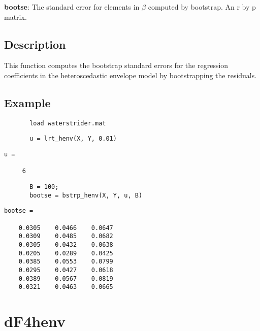 \documentclass[a4paper,11pt,openany]{memoir}
\begin{document}
\begin{par}
\textbf{bootse}: The standard error for elements in $\beta$ computed by bootstrap.  An r by p matrix.
\end{par} \vspace{1em}


\subsection*{Description}

\begin{par}
This function computes the bootstrap standard errors for the regression coefficients in the heteroscedastic envelope model by bootstrapping the residuals.
\end{par} \vspace{1em}


\subsection*{Example}


\begin{verbatim}       load waterstrider.mat\end{verbatim}
    
\begin{verbatim}       u = lrt_henv(X, Y, 0.01)\end{verbatim}
        \color{lightgray}\ttfamily \begin{verbatim}
u =

     6        
\end{verbatim} \rmfamily
\color{black}
\begin{verbatim}       
       B = 100;
       bootse = bstrp_henv(X, Y, u, B)\end{verbatim}
    
        \color{lightgray}\ttfamily \begin{verbatim}
bootse =

    0.0305    0.0466    0.0647
    0.0309    0.0485    0.0682
    0.0305    0.0432    0.0638
    0.0205    0.0289    0.0425
    0.0385    0.0553    0.0799
    0.0295    0.0427    0.0618
    0.0389    0.0567    0.0819
    0.0321    0.0463    0.0665

\end{verbatim} \rmfamily
\color{black}

\newpage


    
\rmfamily
\color{black}\section{dF4henv}
\end{document}
